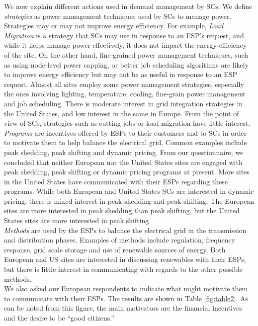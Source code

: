 We now explain different actions used in demand management by SCs. We define \emph{strategies} as power management techniques used by SCs to manage power. Strategies may or may not improve energy efficiency. For example, \emph{Load Migration} is a strategy that SCs may use in response to an ESP's request, and while it helps manage power effectively, it does not impact the energy efficiency of the site. On the other hand, fine-grained power management techniques, such as using node-level power capping, or better job scheduling algorithms are likely to improve energy efficiency but may not be as useful in response to an ESP request. Almost all sites employ some power management strategies, especially the ones involving lighting, temperature, cooling, fine-grain power management and job scheduling. There is moderate interest in grid integration strategies in the United States, and low interest in the same in Europe. From the point of view of SCs, strategies such as cutting jobs or load migration have little interest. \\

\emph{Programs} are incentives offered by ESPs to their customers and to SCs in order to motivate them to help balance the electrical grid. Common examples include peak shedding, peak shifting and dynamic pricing. From our questionnaire, we concluded that neither European nor the United States sites are engaged with peak shedding, peak shifting or dynamic pricing programs at present. More sites in the United States have communicated with their ESPs regarding these programs. While both European and United States SCs are interested in dynamic pricing, there is mixed interest in peak shedding and peak shifting. The European sites are more interested in peak shedding than peak shifting, but the United States sites are more interested in peak shifting. \\



\emph{Methods} are used by the ESPs to balance the electrical grid in the transmission and distribution phases. Examples of methods include regulation, frequency response, grid scale storage and use of renewable sources of energy. Both European and US sites are interested in discussing renewables with their ESPs, but there is little interest in communicating with regards to the other possible methods. \\

We also asked our European respondents to indicate what might motivate them to communicate with their ESPs. The results are shown in Table \ref{fig:table2}. As can be noted from this figure, the main motivators are the financial incentives and the desire to be ``good citizens.''
